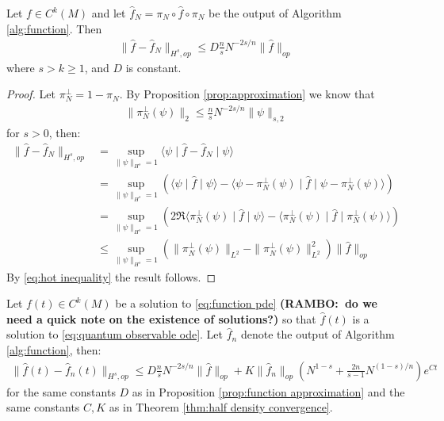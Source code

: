\documentclass[final,leqno]{siamltex1213}
\newcommand{\ram}[1]{{\normalsize{\textbf{({\color{red}RAMBO:\ }#1)}}}}
\begin{document}
\begin{proposition} \label{prop:function approximation}
	Let $f \in C^{k}(M)$ and let $\hat{f}_{N} = \pi_{N} \circ \hat{f} \circ \pi_{N}$ be the output of Algorithm \ref{alg:function}.  Then
	\begin{align}
		\| \hat{f} - \hat{f}_{N} \|_{H^{s},op} \leq D \frac{n}{s} N^{-2s/n} \| \hat{f} \|_{op}
	\end{align}
	where $s > k \geq 1$, and $D$ is constant.
\end{proposition}
\begin{proof}
	Let $\pi_{N}^{\perp} = 1 - \pi_{N}$.  By Proposition \ref{prop:approximation} we know that
	\begin{align}
		\| \pi_{N}^{\perp}(\psi) \|_{2} \leq \frac{n}{s} N^{-2s/n} \| \psi \|_{s,2} \label{eq:hot inequality}
	\end{align}
	for $s>0$, then:
	\begin{align}
		\| \hat{f} - \hat{f}_{N} \|_{H^{s},op} &= \sup_{\| \psi \|_{H^{s}}=1} \langle \psi \mid \hat{f} - \hat{f}_{N} \mid \psi \rangle \\
			&= \sup_{\| \psi \|_{H^{s}}=1} \left( \langle \psi \mid \hat{f}  \mid \psi \rangle - \langle \psi - \pi_{N}^{\perp}(\psi) \mid \hat{f} \mid \psi - \pi_{N}^{\perp}(\psi) \rangle \right) \\
			&= \sup_{\| \psi \|_{H^{s}}=1} \left( 2 \Re \langle \pi_{N}^{\perp}(\psi) \mid \hat{f} \mid \psi \rangle - \langle \pi_{N}^{\perp}(\psi) \mid \hat{f} \mid \pi_{N}^{\perp}(\psi) \rangle \right) \\
			&\leq \sup_{\| \psi \|_{H^{s}}=1}  ( \| \pi_{N}^{\perp}(\psi) \|_{L^{2}}- \| \pi_{N}^{\perp}(\psi) \|_{L^{2}}^{2} ) \| \hat{f} \|_{op} 
	\end{align}
	By \eqref{eq:hot inequality} the result follows.
\end{proof}

\begin{theorem} \label{thm:function convergence}
	Let $f(t) \in C^{k}(M)$ be a solution to \eqref{eq:function pde} \ram{do we need a quick note on the existence of solutions?} so that $\hat{f}(t)$ is a solution to \eqref{eq:quantum observable ode}.
	Let $\hat{f}_{n}$ denote the output of Algorithm \ref{alg:function}, then:
	\begin{align}
		\| \hat{f}(t) - \hat{f}_{n}(t) \|_{H^{s},op} \leq D \frac{n}{s} N^{-2s/n} \| \hat{f} \|_{op}+  K \| \hat{f}_{n} \|_{op} \left( N^{1-s} + \frac{2n}{s -1} N^{(1-s)/n} \right) e^{Ct}
	\end{align}
	for the same constants $D$ as in Proposition \ref{prop:function approximation} and the same constants $C,K$ as in Theorem \ref{thm:half density convergence}.
\end{theorem}
\end{document}
